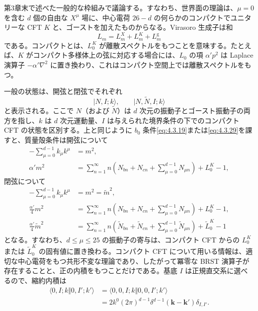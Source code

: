 第3章末で述べた一般的な枠組みで議論する。すなわち、世界面の理論は、$\mu=0$ を含む $d$ 個の自由な $X^\mu$ 場に、中心電荷 $26-d$ の何らかのコンパクトでユニタリーな CFT $K$ と、ゴーストを加えたものからなる。Virasoro 生成子は和
\begin{equation}
L_m=L^X_m+L^K_m+L^{\mathrm g}_m
\tag{4.4.1}\label{eq:4.4.1}
\end{equation}
である。コンパクトとは、$L^K_0$ が離散スペクトルをもつことを意味する。たとえば、$K$ がコンパクト多様体上の弦に対応する場合には、$L_0$ の項 $\alpha'p^2$ は Laplace 演算子 $-\alpha'\nabla^2$ に置き換わり、これはコンパクト空間上では離散スペクトルをもつ。

一般の状態は、開弦と閉弦でそれぞれ
\begin{equation}
|N,I;k\rangle,\qquad|N,\widetilde N,I;k\rangle
\tag{4.4.2}\label{eq:4.4.2}
\end{equation}
と表示される。ここで $N$（および $\widetilde N$）は $d$ 次元の振動子とゴースト振動子の両方を指し、$k$ は $d$ 次元運動量、$I$ は与えられた境界条件の下でのコンパクト CFT の状態を区別する。上と同じように $b_0$ 条件\eqref{eq:4.3.19}または\eqref{eq:4.3.29}を課すと、質量殻条件は開弦について
\begin{align}
-\sum_{\mu=0}^{d-1}k_\mu k^\mu&=m^2,
\tag{4.4.3a}\label{eq:4.4.3a}\\
\alpha'm^2&=\sum_{n=1}^{\infty}n
\left(N_{bn}+N_{cn}+\sum_{\mu=0}^{d-1}N_{\mu n}\right)+L^K_0-1,
\tag{4.4.3b}\label{eq:4.4.3b}
\end{align}
閉弦について
\begin{align}
-\sum_{\mu=0}^{d-1}k_\mu k^\mu&=m^2=\widetilde m^2,
\tag{4.4.4a}\label{eq:4.4.4a}\\
\frac{\alpha'}4m^2&=\sum_{n=1}^{\infty}n
\left(N_{bn}+N_{cn}+\sum_{\mu=0}^{d-1}N_{\mu n}\right)+L^K_0-1,
\tag{4.4.4b}\label{eq:4.4.4b}\\
\frac{\alpha'}4\widetilde m^2&=\sum_{n=1}^{\infty}n
\left(\widetilde N_{bn}+\widetilde N_{cn}
+\sum_{\mu=0}^{d-1}\widetilde N_{\mu n}\right)+\widetilde L^K_0-1
\tag{4.4.4c}\label{eq:4.4.4c}
\end{align}
となる。すなわち、$d\leq\mu\leq25$ の振動子の寄与は、コンパクト CFT からの $L^K_0$ または $\widetilde L^K_0$ の固有値に置き換わる。コンパクト CFT について用いる情報は、適切な中心電荷をもつ共形不変な理論であり、したがって冪零な BRST 演算子が存在することと、正の内積をもつことだけである。基底 $I$ は正規直交系に選べるので、縮約内積は
\begin{equation}
\begin{aligned}
\langle0,I;k\Vert0,I';k'\rangle
&=\langle0,0,I;k\Vert0,0,I';k'\rangle\\
&=2k^0(2\pi)^{d-1}\delta^{d-1}(\mathbf k-\mathbf k')\delta_{I,I'}.
\end{aligned}
\tag{4.4.5}\label{eq:4.4.5}
\end{equation}

